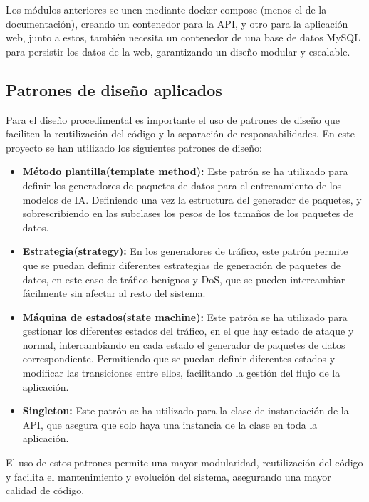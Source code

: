 Los módulos anteriores se unen mediante docker-compose (menos el de la documentación), creando un contenedor para la API, y otro para la aplicación web, junto a estos, también necesita un contenedor de una base de datos MySQL para persistir los datos de la web, garantizando un diseño modular y escalable.


\subsection{Patrones de diseño aplicados}
Para el diseño procedimental es importante el uso de patrones de diseño que faciliten la reutilización del código y la separación de responsabilidades. En este proyecto se han utilizado los siguientes patrones de diseño:
\begin{itemize}
    \item \textbf{Método plantilla(template method): } Este patrón se ha utilizado para definir los generadores de paquetes de datos para el entrenamiento de los modelos de IA. Definiendo una vez la estructura del generador de paquetes, y sobrescribiendo en las subclases los pesos de los tamaños de los paquetes de datos.
    \item \textbf{Estrategia(strategy): } En los generadores de tráfico, este patrón permite que se puedan definir diferentes estrategias de generación de paquetes de datos, en este caso de tráfico benignos y DoS, que se pueden intercambiar fácilmente sin afectar al resto del sistema.
    \item \textbf{Máquina de estados(state machine): } Este patrón se ha utilizado para gestionar los diferentes estados del tráfico, en el que hay estado de ataque y normal, intercambiando en cada estado el generador de paquetes de datos correspondiente. Permitiendo que se puedan definir diferentes estados y modificar las transiciones entre ellos, facilitando la gestión del flujo de la aplicación.
    \item \textbf{Singleton: } Este patrón se ha utilizado para la clase de instanciación de la API, que asegura que solo haya una instancia de la clase en toda la aplicación.
\end{itemize}
El uso de estos patrones permite una mayor modularidad, reutilización del código y facilita el mantenimiento y evolución del sistema, asegurando una mayor calidad de código.
